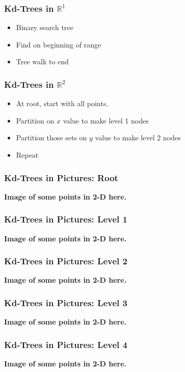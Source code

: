 \documentclass{beamer}
\begin{document}
\begin{frame}
  \frametitle{Kd-Trees in $\mathbb{R}^1$}
  
  \begin{itemize}
  \item Binary search tree
  \item Find on beginning of range
  \item Tree walk to end
  \end{itemize}
\end{frame}

\begin{frame}
  \frametitle{Kd-Trees in $\mathbb{R}^2$}
  \begin{itemize}
  \item At root, start with all points.
  \item Partition on $x$ value to make level 1 nodes
  \item Partition those sets on $y$ value to make level 2 nodes
  \item Repeat
  \end{itemize}
\end{frame}

\begin{frame}
  \frametitle{Kd-Trees in Pictures: Root}

  \textbf{\Huge Image of some points in 2-D here.}  
\end{frame}

\begin{frame}
  \frametitle{Kd-Trees in Pictures: Level 1}

  \textbf{\Huge Image of some points in 2-D here.}  
\end{frame}

\begin{frame}
  \frametitle{Kd-Trees in Pictures: Level 2}

  \textbf{\Huge Image of some points in 2-D here.}  
\end{frame}

\begin{frame}
  \frametitle{Kd-Trees in Pictures: Level 3}

  \textbf{\Huge Image of some points in 2-D here.}  
\end{frame}

\begin{frame}
  \frametitle{Kd-Trees in Pictures: Level 4}

  \textbf{\Huge Image of some points in 2-D here.}  
\end{frame}
\end{document}
